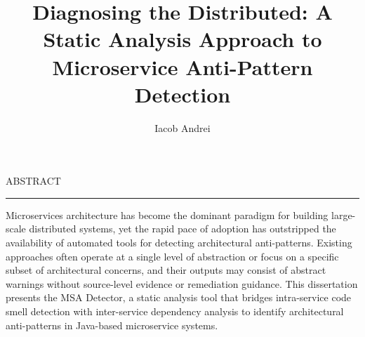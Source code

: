 \documentclass[12pt]{report}
\begin{document}
    \title{Diagnosing the Distributed: A Static Analysis Approach to Microservice Anti-Pattern Detection}
    \author{Iacob Andrei}

    \maketitle


\newpage
\thispagestyle{empty}
\mbox{}
\newpage
{} 

\cleardoublepage
ABSTRACT
\vspace{0.5cm}	
\hrule
\vspace{0.5cm}	

\par Microservices architecture has become the dominant paradigm for building large-scale distributed systems, yet the rapid pace of adoption has outstripped the availability of automated tools for detecting architectural anti-patterns. Existing approaches often operate at a single level of abstraction or focus on a specific subset of architectural concerns, and their outputs may consist of abstract warnings without source-level evidence or remediation guidance. This dissertation presents the MSA Detector, a static analysis tool that bridges intra-service code smell detection with inter-service dependency analysis to identify architectural anti-patterns in Java-based microservice systems.
\end{document}

